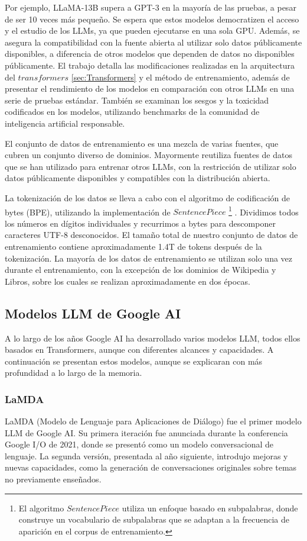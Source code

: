 Por ejemplo, LLaMA-13B supera a GPT-3 en la mayoría de las pruebas, a pesar de ser 10 veces más pequeño. Se espera que estos modelos democratizen el acceso y el estudio de los LLMs, ya que pueden ejecutarse en una sola GPU. Además, se asegura la compatibilidad con la fuente abierta al utilizar solo datos públicamente disponibles, a diferencia de otros modelos que dependen de datos no disponibles públicamente. El trabajo detalla las modificaciones realizadas en la arquitectura del $transformers$ \ref{sec:Transformers} y el método de entrenamiento, además de presentar el rendimiento de los modelos en comparación con otros LLMs en una serie de pruebas estándar. También se examinan los sesgos y la toxicidad codificados en los modelos, utilizando benchmarks de la comunidad de inteligencia artificial responsable.

El conjunto de datos de entrenamiento es una mezcla de varias fuentes, que cubren un conjunto diverso de dominios. Mayormente reutiliza fuentes de datos que se han utilizado para entrenar otros LLMs, con la restricción de utilizar solo datos públicamente disponibles y compatibles con la distribución abierta.

La tokenización de los datos se lleva a cabo con el algoritmo de codificación de bytes (BPE), utilizando la implementación de  $SentencePiece$ \footnote{El algoritmo $SentencePiece$ \cite{kudo2018sentencepiece} utiliza un enfoque basado en subpalabras, donde construye un vocabulario de subpalabras que se adaptan a la frecuencia de aparición en el corpus de entrenamiento. } . Dividimos todos los números en dígitos individuales y recurrimos a bytes para descomponer caracteres UTF-8 desconocidos. El tamaño total de nuestro conjunto de datos de entrenamiento contiene aproximadamente 1.4T de tokens después de la tokenización. La mayoría de los datos de entrenamiento se utilizan solo una vez durante el entrenamiento, con la excepción de los dominios de Wikipedia y Libros, sobre los cuales se realizan aproximadamente en dos épocas.
\subsection{Modelos LLM de Google AI}
A lo largo de los años Google AI ha desarrollado varios modelos LLM, todos ellos basados en Transformers, aunque con diferentes alcances y capacidades. A continuación se presentan estos modelos, aunque se explicaran con más profundidad a lo largo de la memoria. 
\subsubsection{LaMDA}
\label{sec:LaMDA}
LaMDA (Modelo de Lenguaje para Aplicaciones de Diálogo) fue el primer modelo LLM de Google AI. Su primera iteración fue anunciada durante la conferencia Google I/O de 2021, donde se presentó como un modelo conversacional de lenguaje. La segunda versión, presentada al año siguiente, introdujo mejoras y nuevas capacidades, como la generación de conversaciones originales sobre temas no previamente enseñados.

